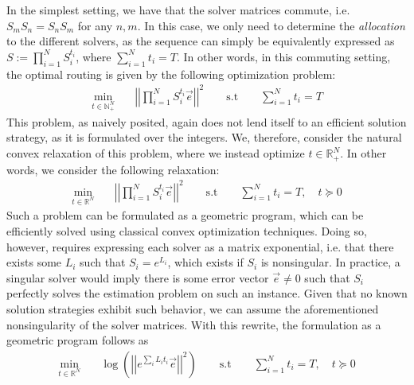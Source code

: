 \documentclass[12pt]{article}
\begin{document}
In the simplest setting, we have that the solver matrices commute, i.e. $S_m S_n = S_n S_m$ for any $n, m$. In this case, we only need to determine the \textit{allocation} to the different solvers, as the sequence can simply be equivalently expressed as $S := \prod_{i=1}^{N} S_i^{t_i}$, where $\sum_{i=1}^{N} t_i = T$. In other words, in this commuting setting, the optimal routing is given by the following optimization problem:
\begin{equation}
\begin{aligned}
    \min_{t\in\mathbb{N}_{+}^{N}}&\quad \left|\left| \prod_{i=1}^{N} S_i^{t_i} \vec{e} \right|\right|^2 
    \qquad\mathrm{s.t}\qquad \sum_{i=1}^{N} t_i = T
\end{aligned}
\end{equation}
This problem, as naively posited, again does not lend itself to an efficient solution strategy, as it is formulated over the integers. We, therefore, consider the natural convex relaxation of this problem, where we instead optimize $t\in\mathbb{R}_{+}^{N}$. In other words, we consider the following relaxation:
\begin{equation}
\begin{aligned}
    \min_{t\in\mathbb{R}^{N}}&\quad \left|\left| \prod_{i=1}^{N} S_i^{t_i} \vec{e} \right|\right|^2 
    \qquad\mathrm{s.t}\qquad \sum_{i=1}^{N} t_i = T, \quad t\succeq 0
\end{aligned}
\end{equation}
Such a problem can be formulated as a geometric program, which can be efficiently solved using classical convex optimization techniques. Doing so, however, requires expressing each solver as a matrix exponential, i.e. that there exists some $L_i$ such that $S_i = e^{L_i}$, which exists if $S_i$ is nonsingular. In practice, a singular solver would imply there is some error vector $\vec{e}\neq 0$ such that $S_i$ perfectly solves the estimation problem on such an instance. Given that no known solution strategies exhibit such behavior, we can assume the aforementioned nonsingularity of the solver matrices. With this rewrite, the formulation as a geometric program follows as
\begin{align*}
    \min_{t\in\mathbb{R}^{N}}&\quad \log\left(\left|\left| e^{\sum_i L_i t_i} \vec{e} \right|\right|^2\right)
    \qquad\mathrm{s.t}\qquad \sum_{i=1}^{N} t_i = T, \quad t\succeq 0
\end{align*}
\end{document}
